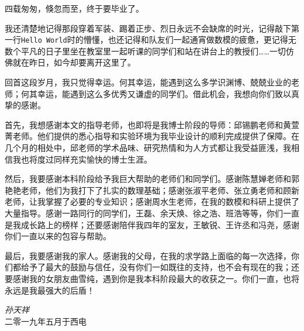 
\begin{acknowledgments}

四载匆匆，倏忽而至，终于要毕业了。

我还清楚地记得那段穿着军装、踢着正步、烈日永远不会缺席的时光，记得敲下第一行\texttt{Hello World}时的懵懂，也还记得和队友们一起通宵做数模的疲惫，更记得无数个平凡的日子里坐在教室里一起听课的同学们和站在讲台上的教授们……一切仿佛就在昨日，如今却要离开这里了。

回首这段岁月，我只觉得幸运。何其幸运，能遇到这么多学识渊博、兢兢业业的老师；何其幸运，能遇到这么多优秀又谦虚的同学们。借此机会，我想向你们致以真挚的感谢。

首先，我想感谢本文的指导老师，也即将是我博士阶段的导师：邱锡鹏老师和黄萱菁老师。他们提供的悉心指导和实验环境为我毕业设计的顺利完成提供了保障。在几个月的相处中，邱老师的学术品味、研究热情和为人方式都让我受益匪浅，我相信我也将度过同样充实愉快的博士生涯。

然后，我要感谢本科阶段给予我巨大帮助的老师们和同学们。感谢陈慧婵老师和郭艳艳老师，他们为我打下了扎实的数理基础；感谢张淑平老师、张立勇老师和顾新老师，让我掌握了必要的专业知识；感谢周水生老师，在我的数模和科研上提供了大量指导。感谢一路同行的同学们，王磊、余天焕、徐之浩、班浩等等，你们一直是我成长路上的榜样；还要感谢陪伴我四年的室友，王敏锐、王许丞和冯尧，感谢你们一直以来的包容与帮助。

最后，我要感谢我的家人。感谢我的父母，在我的求学路上面临的每一次选择，你们都给予了最大的鼓励与信任，没有你们一如既往的支持，也不会有现在的我；还要感谢我的女朋友曲雪纯，遇到你是我本科阶段最大的收获之一。你们一直，也将永远是我最强大的后盾！

\begin{flushright}
	\emph{孙天祥}\\
	二零一九年五月于西电
\end{flushright}

\end{acknowledgments}

